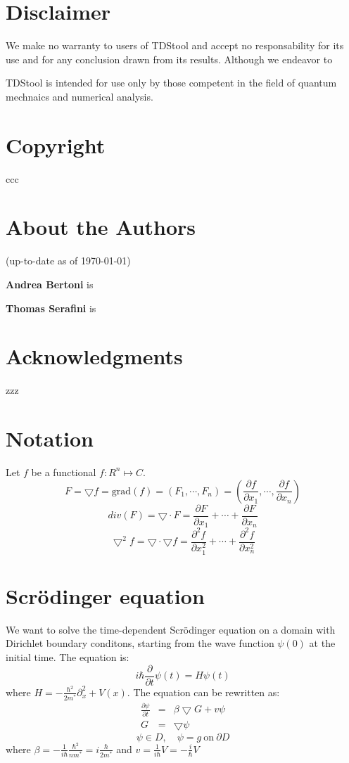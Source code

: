\documentclass[a4paper,11pt]{article}
\begin{document}
\section*{Disclaimer}
We make no warranty to users of TDStool and accept no responsability for
its use and for any conclusion drawn from its results.  Although we endeavor
to 


TDStool is intended
for use only by those competent in the field of quantum mechnaics and
numerical analysis.

\section*{Copyright}
ccc

\section*{About the Authors}
(up-to-date as of \today)

{\bf Andrea Bertoni} is

{\bf Thomas Serafini} is

\section*{Acknowledgments}
zzz

\newpage

\tableofcontents

\newpage

\pagestyle{fancy}

\section{Notation}
Let $f$ be a functional $f:R^n\mapsto C$.
$$ F = \bigtriangledown f = \mbox{grad}(f) = (F_1, \cdots, F_n) =
  \left( \frac{\partial f}{\partial x_1}, \cdots, \frac{\partial f}{\partial x_n} \right) $$
$$ div(F) = \bigtriangledown \cdot F = \frac{\partial F}{\partial x_1} + \cdots + \frac{\partial F}{\partial x_n} $$
$$ \bigtriangledown^2 f = \bigtriangledown \cdot \bigtriangledown f =
    \frac{\partial^2 f}{\partial x_1^2} + \cdots + \frac{\partial^2 f}{\partial x_n^2} $$

\section{Scr\"{o}dinger equation}
We want to solve the time-dependent Scr\"{o}dinger equation on a domain with Dirichlet boundary conditons, starting from the wave function $\psi(0)$ at the initial time. The equation is:
$$ i \hbar \frac{\partial}{\partial t} \psi(t) = H \psi(t) $$
where $ H = - \frac{\hbar^2}{2m^*}\partial_x^2 + V(x) $.
The equation can be rewritten as:
\begin{eqnarray}
\frac{\partial \psi}{\partial t} & = & \beta \bigtriangledown G + v\psi \\
G & = & \bigtriangledown \psi
\end{eqnarray}
$$ \psi \in D, \quad \psi = g \ \mbox{on} \ \partial D $$
where $\beta = - \frac{1}{i \hbar} \frac{\hbar^2}{nm^*} = i \frac{\hbar}{2m^*} $
and $ v = \frac{1}{i \hbar} V = -\frac{i}{\hbar}V $
\end{document}
